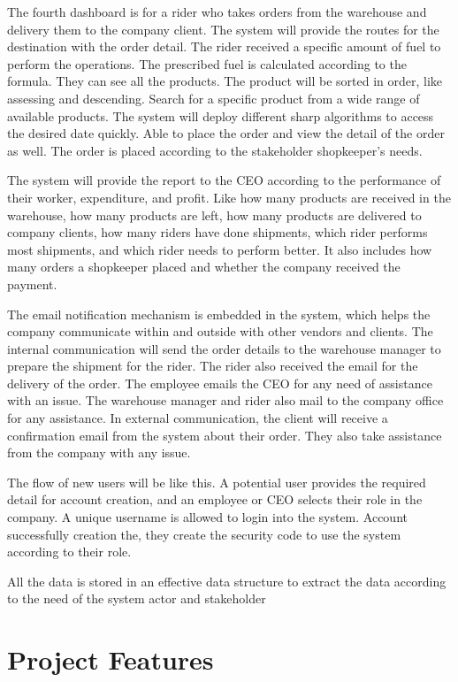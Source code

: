 \documentclass[12pt,a4paper]{report}
\begin{document}
The fourth dashboard is for a rider who takes orders from the warehouse and delivery them to the company client. The system will provide the routes for the destination with the order detail. The rider received a specific amount of fuel to perform the operations. The prescribed fuel is calculated according to the formula. They can see all the products. The product will be sorted in order, like assessing and descending. Search for a specific product from a wide range of available products. The system will deploy different sharp algorithms to access the desired date quickly. Able to place the order and view the detail of the order as well. The order is placed according to the stakeholder shopkeeper's needs.
 
The system will provide the report to the CEO according to the performance of their worker, expenditure, and profit.
Like how many products are received in the warehouse, how many products are left, how many products are delivered to company clients, how many riders have done shipments, which rider performs most shipments, and which rider needs to perform better. It also includes how many orders a shopkeeper placed and whether the company received the payment. 
 
The email notification mechanism is embedded in the system, which helps the company communicate within and outside with other vendors and clients. The internal communication will send the order details to the warehouse manager to prepare the shipment for the rider. The rider also received the email for the delivery of the order. The employee emails the CEO for any need of assistance with an issue. The warehouse manager and rider also mail to the company office for any assistance. In external communication, the client will receive a confirmation email from the system about their order. They also take assistance from the company with any issue.
 
The flow of new users will be like this. A potential user provides the required detail for account creation, and an employee or CEO selects their role in the company. A unique username is allowed to login into the system. Account successfully creation the, they create the security code to use the system according to their role. 
 
All the data is stored in an effective data structure to extract the data according to the need of the system actor and stakeholder


\newpage
\chapter {Project Features}
\end{document}
